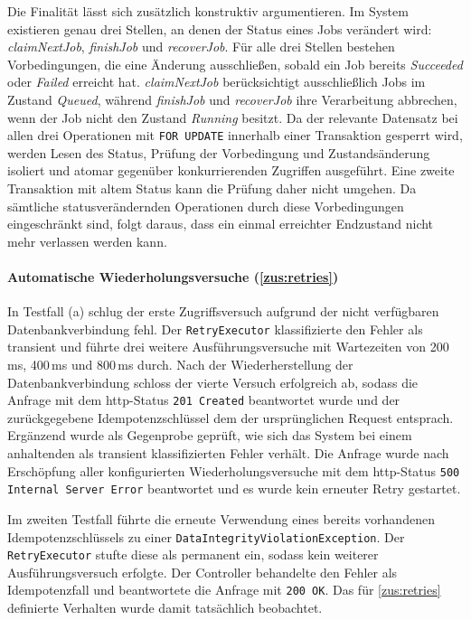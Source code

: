 Die Finalität lässt sich zusätzlich konstruktiv argumentieren.
Im System existieren genau drei Stellen, an denen der Status eines Jobs verändert wird: \textit{claimNextJob}, \textit{finishJob}
und \textit{recoverJob}.
Für alle drei Stellen bestehen Vorbedingungen, die eine Änderung ausschließen, sobald ein Job bereits \textit{Succeeded}
oder \textit{Failed} erreicht hat. \textit{claimNextJob} berücksichtigt ausschließlich Jobs im Zustand \textit{Queued},
während \textit{finishJob} und \textit{recoverJob} ihre Verarbeitung abbrechen, wenn der Job nicht den Zustand \textit{Running} besitzt.
Da der relevante Datensatz bei allen drei Operationen mit \texttt{FOR UPDATE} innerhalb einer Transaktion gesperrt wird,
werden Lesen des Status, Prüfung der Vorbedingung und Zustandsänderung isoliert und atomar gegenüber konkurrierenden Zugriffen ausgeführt.
Eine zweite Transaktion mit altem Status kann die Prüfung daher nicht umgehen.
Da sämtliche statusverändernden Operationen durch diese Vorbedingungen eingeschränkt sind, folgt daraus, dass ein einmal
erreichter Endzustand nicht mehr verlassen werden kann.

\paragraph{Automatische Wiederholungsversuche (\ref{zus:retries})}
\label{erg:retries}
In Testfall (a) schlug der erste Zugriffsversuch aufgrund der nicht verfügbaren Datenbankverbindung fehl.
Der \texttt{RetryExecutor} klassifizierte den Fehler als transient und führte drei weitere Ausführungsversuche mit
Wartezeiten von 200\,ms, 400\,ms und 800\,ms durch.
Nach der Wiederherstellung der Datenbankverbindung schloss der vierte Versuch erfolgreich ab, sodass die Anfrage mit dem \gls{http}-Status
\texttt{201 Created} beantwortet wurde und der zurückgegebene Idempotenzschlüssel dem der ursprünglichen Request entsprach.
Ergänzend wurde als Gegenprobe geprüft, wie sich das System bei einem anhaltenden als transient klassifizierten Fehler verhält.
Die Anfrage wurde nach Erschöpfung aller konfigurierten Wiederholungsversuche mit dem \gls{http}-Status \texttt{500 Internal Server
Error} beantwortet und es wurde kein erneuter Retry gestartet.

Im zweiten Testfall führte die erneute Verwendung eines bereits vorhandenen Idempotenzschlüssels zu einer
\texttt{DataIntegrityViolationException}.
Der \texttt{RetryExecutor} stufte diese als permanent ein, sodass kein weiterer Ausführungsversuch erfolgte.
Der Controller behandelte den Fehler als Idempotenzfall und beantwortete die Anfrage mit \texttt{200 OK}.
Das für \ref{zus:retries} definierte Verhalten wurde damit tatsächlich beobachtet.

